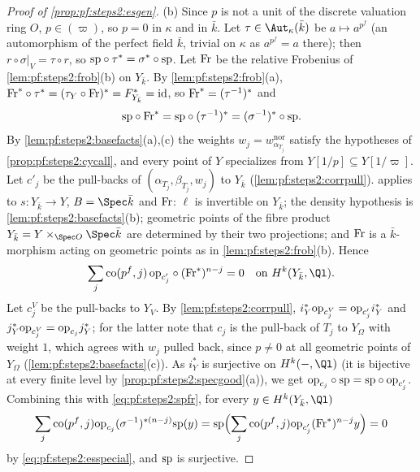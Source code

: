 \begin{proof}[Proof of \cref{prop:pf:steps2:esgen}]
(b) Since $p$ is not a unit of the discrete valuation ring $O$, $p\in(\varpi)$, so $p=0$ in $\kappa$ and
in $\bar k$. Let $\tau\in\Aut_\kappa(\bar k)$ be $a\mapsto a^{p^f}$ (an automorphism of the perfect
field $\bar k$, trivial on $\kappa$ as $a^{p^f}=a$ there); then $r\circ\sigma|_V=\tau\circ r$, so
$\mathrm{sp}\circ\tau^\ast=\sigma^\ast\circ\mathrm{sp}$. Let $\mathrm{Fr}$ be the relative Frobenius of
\cref{lem:pf:steps2:frob}(b) on $Y_{\bar k}$. By \cref{lem:pf:steps2:frob}(a),
$\mathrm{Fr}^\ast\circ\tau^\ast=(\tau_Y\circ\mathrm{Fr})^\ast=F_{Y_{\bar k}}^\ast=\mathrm{id}$, so
$\mathrm{Fr}^\ast=(\tau^{-1})^\ast$ and
\begin{equation}\label{eq:pf:steps2:spfr}
  \mathrm{sp}\circ\mathrm{Fr}^\ast=\mathrm{sp}\circ(\tau^{-1})^\ast=(\sigma^{-1})^\ast\circ\mathrm{sp} .
\end{equation}
By \cref{lem:pf:steps2:basefacts}(a),(c) the weights $w_j=w^{\mathrm{nor}}_{\alpha_{T_j}}$ satisfy the
hypotheses of \cref{prop:pf:steps2:cycall}, and every point of $Y$ specializes from $Y[1/p]\subseteq
Y[1/\varpi]$. Let $c'_j$ be the pull-backs of $(\alpha_{T_j},\beta_{T_j},w_j)$ to $Y_{\bar k}$
(\cref{lem:pf:steps2:corrpull}).  applies to $s\colon Y_{\bar k}\to Y$,
$B=\Spec\bar k$ and $\mathrm{Fr}$: $\ell$ is invertible on $Y_{\bar k}$; the density hypothesis is
\cref{lem:pf:steps2:basefacts}(b); geometric points of the fibre product $Y_{\bar k}=Y\times_{\Spec
O}\Spec\bar k$ are determined by their two projections; and $\mathrm{Fr}$ is a $\bar k$-morphism acting
on geometric points as in \cref{lem:pf:steps2:frob}(b). Hence
\begin{equation}\label{eq:pf:steps2:esspecial}
  \sum_j\stepsiico(p^f,j)\,\stepsiiop_{c'_j}\circ(\stepsiiFr^\ast)^{n-j}=0\quad\text{on }H^k(Y_{\bar
  k},\Ql).
\end{equation}
Let $c^V_j$ be the pull-backs to $Y_V$. By \cref{lem:pf:steps2:corrpull},
$i_Y^\ast\mathrm{op}_{c^V_j}=\mathrm{op}_{c'_j}i_Y^\ast$ and $j_Y^\ast\mathrm{op}_{c^V_j}=\mathrm{op}_{c_j}j_Y^\ast$;
for the latter note that $c_j$ is the pull-back of $T_j$ to $Y_\Omega$ with weight $1$, which agrees
with $w_j$ pulled back, since $p\ne0$ at all geometric points of $Y_\Omega$
(\cref{lem:pf:steps2:basefacts}(c)). As $i_Y^\ast$ is surjective on $H^k(-,\Ql)$ (it is bijective at
every finite level by \cref{prop:pf:steps2:specgood}(a)), we get
$\mathrm{op}_{c_j}\circ\mathrm{sp}=\mathrm{sp}\circ\mathrm{op}_{c'_j}$. Combining this with
\eqref{eq:pf:steps2:spfr}, for every $y\in H^k(Y_{\bar k},\Ql)$
\[
  \sum_j\mathrm{co}(p^f,j)\mathrm{op}_{c_j}(\sigma^{-1})^{\ast(n-j)}\mathrm{sp}(y)
  =\mathrm{sp}\Bigl(\sum_j\mathrm{co}(p^f,j)\mathrm{op}_{c'_j}(\mathrm{Fr}^\ast)^{n-j}y\Bigr)=0
\]
by \eqref{eq:pf:steps2:esspecial}, and $\mathrm{sp}$ is surjective.
\end{proof}


